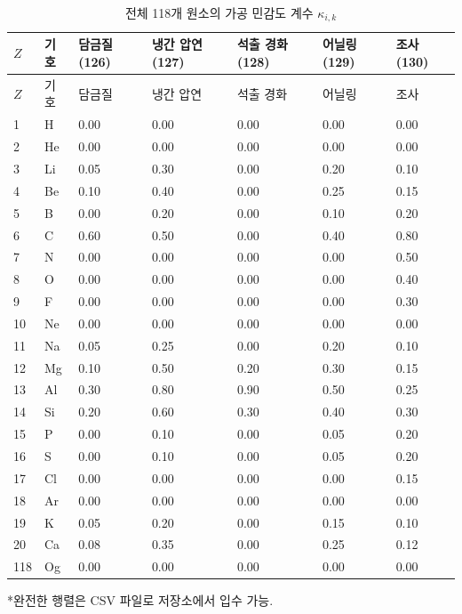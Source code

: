\documentclass[12pt,a4paper]{article}
\begin{document}
	\begin{longtable}{p{2.2cm}p{1.2cm}p{2.2cm}p{2.2cm}p{2.2cm}p{2.2cm}p{2.2cm}}
		\caption{전체 118개 원소의 가공 민감도 계수 \(\kappa_{i,k}\)} \label{tab:kappa-ik-full} \\
		\toprule
		\(Z\) & 기호 & 담금질 (126) & 냉간 압연 (127) & 석출 경화 (128) & 어닐링 (129) & 조사 (130) \\
		\midrule
		\endfirsthead
		\toprule
		\(Z\) & 기호 & 담금질 & 냉간 압연 & 석출 경화 & 어닐링 & 조사 \\
		\midrule
		\endhead
		1  & H   & 0.00 & 0.00 & 0.00 & 0.00 & 0.00 \\
		2  & He  & 0.00 & 0.00 & 0.00 & 0.00 & 0.00 \\
		3  & Li  & 0.05 & 0.30 & 0.00 & 0.20 & 0.10 \\
		4  & Be  & 0.10 & 0.40 & 0.00 & 0.25 & 0.15 \\
		5  & B   & 0.00 & 0.20 & 0.00 & 0.10 & 0.20 \\
		6  & C   & 0.60 & 0.50 & 0.00 & 0.40 & 0.80 \\
		7  & N   & 0.00 & 0.00 & 0.00 & 0.00 & 0.50 \\
		8  & O   & 0.00 & 0.00 & 0.00 & 0.00 & 0.40 \\
		9  & F   & 0.00 & 0.00 & 0.00 & 0.00 & 0.30 \\
		10 & Ne  & 0.00 & 0.00 & 0.00 & 0.00 & 0.00 \\
		11 & Na  & 0.05 & 0.25 & 0.00 & 0.20 & 0.10 \\
		12 & Mg  & 0.10 & 0.50 & 0.20 & 0.30 & 0.15 \\
		13 & Al  & 0.30 & 0.80 & 0.90 & 0.50 & 0.25 \\
		14 & Si  & 0.20 & 0.60 & 0.30 & 0.40 & 0.30 \\
		15 & P   & 0.00 & 0.10 & 0.00 & 0.05 & 0.20 \\
		16 & S   & 0.00 & 0.10 & 0.00 & 0.05 & 0.20 \\
		17 & Cl  & 0.00 & 0.00 & 0.00 & 0.00 & 0.15 \\
		18 & Ar  & 0.00 & 0.00 & 0.00 & 0.00 & 0.00 \\
		19 & K   & 0.05 & 0.20 & 0.00 & 0.15 & 0.10 \\
		20 & Ca  & 0.08 & 0.35 & 0.00 & 0.25 & 0.12 \\
		118& Og  & 0.00 & 0.00 & 0.00 & 0.00 & 0.00 \\
		\bottomrule
	\end{longtable}
	*완전한 행렬은 CSV 파일로 저장소에서 입수 가능.
	
\end{document}
